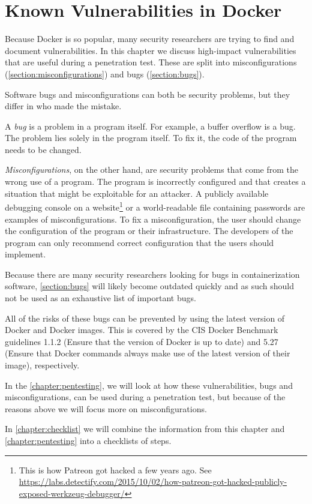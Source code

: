 \chapter{Known Vulnerabilities in Docker}\label{chapter:vulnerabilities}
Because Docker is so popular, many security researchers are trying to find and document vulnerabilities. In this chapter we discuss high-impact vulnerabilities that are useful during a penetration test. These are split into misconfigurations (\autoref{section:misconfigurations}) and bugs (\autoref{section:bugs}).

\medskip

Software bugs and misconfigurations can both be security problems, but they differ in who made the mistake.

A \emph{bug} is a problem in a program itself. For example, a buffer overflow is a bug. The problem lies solely in the program itself. To fix it, the code of the program needs to be changed.

\emph{Misconfigurations}, on the other hand, are security problems that come from the wrong use of a program. The program is incorrectly configured and that creates a situation that might be exploitable for an attacker. A publicly available debugging console on a website\footnote{This is how Patreon got hacked a few years ago. See \url{https://labs.detectify.com/2015/10/02/how-patreon-got-hacked-publicly-exposed-werkzeug-debugger/}} or a world-readable file containing passwords are examples of misconfigurations. To fix a misconfiguration, the user should change the configuration of the program or their infrastructure. The developers of the program can only recommend correct configuration that the users should implement.

\medskip

Because there are many security researchers looking for bugs in containerization software, \autoref{section:bugs} will likely become outdated quickly and as such should not be used as an exhaustive list of important bugs.

All of the risks of these bugs can be prevented by using the latest version of Docker and Docker images. This is covered by the CIS Docker Benchmark guidelines 1.1.2 (Ensure that the version of Docker is up to date) and 5.27 (Ensure that Docker commands always make use of the latest version of their image), respectively.

In the \autoref{chapter:pentesting}, we will look at how these vulnerabilities, bugs and misconfigurations, can be used during a penetration test, but because of the reasons above we will focus more on misconfigurations.

\medskip

In \autoref{chapter:checklist} we will combine the information from this chapter and \autoref{chapter:pentesting} into a checklists of steps.



